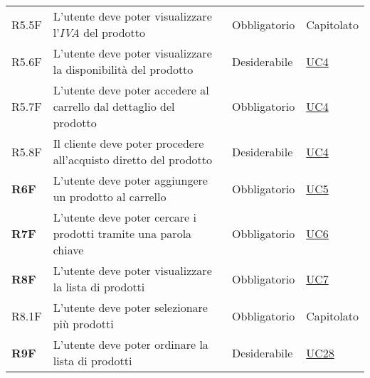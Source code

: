 \begin{center}
\begin{longtable}[!h]{p{50px} p{245px} p{75px} p{50px}}
        R5.5F                                 & L'utente deve poter visualizzare l'\textit{IVA} del prodotto                                                                                           & Obbligatorio             & Capitolato                                   \\
        R5.6F                                 & L'utente deve poter visualizzare la disponibilità del prodotto                                                                                         & Desiderabile             & \hyperref[sec:UC4]{UC4}                      \\
        R5.7F                                 & L'utente deve poter accedere al carrello dal dettaglio del prodotto                                                                                    & Obbligatorio             & \hyperref[sec:UC4]{UC4}                      \\
        R5.8F                                 & Il cliente deve poter procedere all'acquisto diretto del prodotto                                                                                      & Desiderabile             & \hyperref[sec:UC4]{UC4}                      \\
        \textbf{R6F}                          & L'utente deve poter aggiungere un prodotto al carrello                                                                                                 & Obbligatorio             & \hyperref[sec:UC5]{UC5}                      \\
        \textbf{R7F}                          & L'utente deve poter cercare i prodotti tramite una parola chiave                                                                                       & Obbligatorio             & \hyperref[sec:UC6]{UC6}                      \\
        \textbf{R8F}                          & L'utente deve poter visualizzare la lista di prodotti                                                                                                  & Obbligatorio             & \hyperref[sec:UC7]{UC7}                      \\
        R8.1F                                 & L'utente deve poter selezionare più prodotti                                                                                                           & Obbligatorio             & Capitolato                                   \\
        \textbf{R9F}                          & L'utente deve poter ordinare la lista di prodotti                                                                                                      & Desiderabile             & \hyperref[sec:UC28]{UC28}                    \\

\end{longtable}
\end{center}
